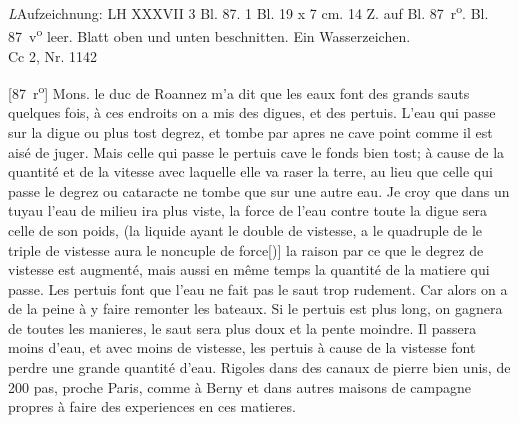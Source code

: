 \begin{Ueberlieferung}%
{\textit{L}}Aufzeichnung: LH XXXVII 3 Bl. 87. 1 Bl. 19 x 7 cm. 14 Z. auf Bl. 87~r\textsuperscript{o}. Bl. 87~v\textsuperscript{o} leer. Blatt oben und unten beschnitten. Ein Wasserzeichen.\\%
Cc 2, Nr. 1142 
\end{Ueberlieferung}
%
%
\count{}
\count{}
\count{}
\pstartfirst%
[87~r\textsuperscript{o}]
Mons. le duc de Roannez\protect{} m'a dit que les eaux font des grands sauts quelques fois, \`{a} ces endroits on a mis des digues,\protect{} et des pertuis\protect{}. L'eau qui passe sur la digue\protect{} ou plus tost degrez, et tombe par apres ne cave point comme il est ais\'{e} de juger. Mais celle qui passe le pertuis\protect{} cave le fonds bien tost; \`{a} cause de la quantit\'{e} et de la vitesse avec laquelle elle va raser la terre, au lieu que celle qui passe le degrez ou cataracte ne tombe que sur une autre eau. Je croy que dans un tuyau l'eau de milieu ira plus viste, la force de l'eau\protect{} contre toute la digue\protect{} sera celle de son poids\protect{}, (la liquide ayant le double de vistesse, a le quadruple de 
le triple de vistesse aura le noncuple de force[)]
la raison par ce que le degrez de vistesse est augment\'{e},
mais aussi en même temps la quantit\'{e} de la matiere qui passe. Les pertuis\protect{} font que l'eau ne fait pas le saut\protect{} trop rudement. Car alors on a de la peine \`{a} y faire remonter les bateaux.\protect{} Si le pertuis\protect{} est plus long, on gagnera de toutes les manieres, le saut sera plus doux et la pente moindre. Il passera moins d'eau, et avec moins de vistesse, les pertuis\protect{} \`{a} cause de la vistesse font perdre une grande quantit\'{e} d'eau\protect{}. Rigoles\protect{} dans des canaux\protect{} de pierre bien unis, de 200 pas, proche Paris\protect{}, comme \`{a} Berny\protect{} et dans autres maisons de campagne propres \`{a} faire des experiences\protect{} en ces matieres.  
\pend 
\count{}
\count{}
\count{}
 

